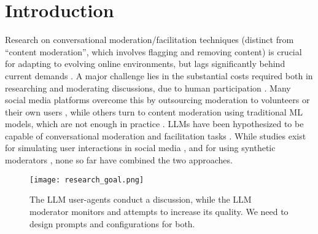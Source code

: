 %
\section{Introduction}
\label{sec:introduction}

Research on conversational moderation/facilitation techniques (distinct from “content moderation”, which involves flagging and removing content) is crucial for adapting to evolving online environments, but lags significantly behind current demands \cite{seering_self_moderation, make_reddit_great}. A major challenge lies in the substantial costs required both in researching and moderating discussions, due to human participation \cite{rossi_2024}. Many social media platforms overcome this by outsourcing moderation to volunteers or their own users \cite{Matias2019TheCL, schaffner_community_guidelines}, while others turn to content moderation using traditional \ac{ML} models, which are not enough in practice \cite{horta_automated_moderation, schaffner_community_guidelines}. \acfp{LLM} have been hypothesized to be capable of conversational moderation and facilitation tasks \cite{small-polis-llm, korre2025evaluation}. While studies exist for simulating user interactions in social media \cite{park_simulacra, mou_2024, tornberg_2023, y_social, balog_2024}, and for using synthetic moderators \cite{kim_et_al_chatbot, cho-etal-2024-language}, none so far have combined the two approaches. 

\begin{figure}[hbt!]
	\centering
	\texttt{[image: research\_goal.png]}
	\caption{The \ac{LLM} user-agents conduct a discussion, while the \ac{LLM} moderator monitors and attempts to increase its quality. We need to design prompts and configurations for both.}
	\label{fig::goals}
\end{figure}


